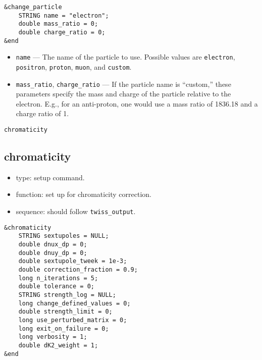 \documentclass[11pt]{article}
\begin{document}
\begin{verbatim}
&change_particle
    STRING name = "electron";
    double mass_ratio = 0;
    double charge_ratio = 0;
&end
\end{verbatim}

\begin{itemize}
\item \verb|name| --- The name of the particle to use.  Possible values are \verb|electron|, \verb|positron|,
  \verb|proton|, \verb|muon|, and \verb|custom|.
\item \verb|mass_ratio|, \verb|charge_ratio| --- If the particle name is ``custom,'' these parameters specify the
  mass and charge of the particle relative to the electron.  E.g., for an anti-proton, one would use
  a mass ratio of 1836.18 and a charge ratio of 1.
\end{itemize}

\newpage
\begin{center}{\Large\verb|chromaticity|}\end{center}
\subsection{chromaticity \label{subsec:chromaticity}}

\begin{itemize}
\item type: setup command.
\item function: set up for chromaticity correction.
\item sequence: should follow \verb|twiss_output|.
\end{itemize}

\begin{verbatim}
&chromaticity
    STRING sextupoles = NULL;
    double dnux_dp = 0;
    double dnuy_dp = 0;
    double sextupole_tweek = 1e-3;
    double correction_fraction = 0.9;
    long n_iterations = 5;
    double tolerance = 0;
    STRING strength_log = NULL;
    long change_defined_values = 0;
    double strength_limit = 0;
    long use_perturbed_matrix = 0;    
    long exit_on_failure = 0;
    long verbosity = 1;
    double dK2_weight = 1;
&end
\end{verbatim}
\end{document}
